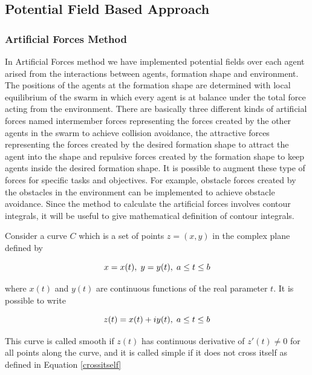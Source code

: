\subsection{Potential Field Based Approach}

\subsubsection{Artificial Forces Method} \label{Artificial Forces Ref} \label{Artificial_forces_ref}
In Artificial Forces method we have implemented potential fields over each agent arised from the interactions between agents, formation shape and environment. The positions of the agents at the formation shape  are determined with local equilibrium of the swarm in which every agent is at balance under the total force acting from the environment. There are basically three different kinds of artificial forces named intermember forces representing the forces created by the other agents in the swarm to achieve collision avoidance, the attractive forces representing the forces created by the desired formation shape to attract the agent into the shape and repulsive forces created by the formation shape to keep agents inside the desired formation shape. It is possible to augment these type of forces for specific tasks and objectives. For example, obstacle forces created by the obstacles in the environment can be implemented to achieve obstacle avoidance. Since the method to calculate the artificial forces involves contour integrals, it will be useful to give mathematical definition of contour integrals.
		
Consider a curve $C$ which is a set of points $z = (x,y)$ in the complex plane defined by \cite{wiki_contour}

\begin{equation}
x = x(t),   \hspace{0.1cm} y = y(t),  \hspace{0.1cm} a\leq t \leq b
\end{equation}

where $x(t)$ and $y(t)$ are continuous functions of the real parameter $t$.  It is possible to write
		
\begin{equation}
z(t) = x(t)+iy(t),   \hspace{0.1cm} a\leq t \leq b
\end{equation}
		
This curve is called smooth if $z(t)$ has continuous derivative of $z'(t) \neq 0$ for all points along the curve, and it is called simple if it does not cross itself as defined in Equation \ref{crossitself}

